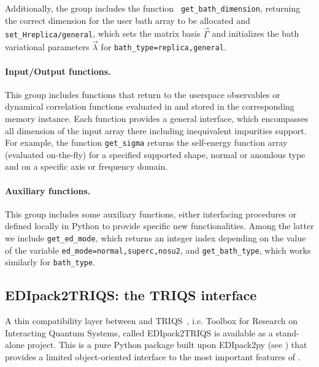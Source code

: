 \documentclass[edipack_sp.tex]{subfiles}
\begin{document}
Additionally, the group includes the function {\tt
  get\_bath\_dimension}, returning the correct
dimension for the user bath array to be allocated and {\tt
  set\_H{replica/general}}, which sets the matrix basis
$\vec{\Gamma}$ and initializes the bath variational parameters
$\vec{\lambda}$ for {\tt bath\_type=replica,general}. 




  
\paragraph{{\bf Input/Output functions}.}
This group includes functions that return to the userspace
observables or dynamical correlation functions evaluated in \NAME and
stored in the corresponding memory instance. Each function
provides a general interface, which encompasses all dimension of the
input array there including inequivalent impurities support.
For example, the function {\tt get\_sigma} returns the self-energy
function array (evaluated on-the-fly) for a specified supported shape,
normal or anomlous type and on a specific axis or frequency domain. 
    

\paragraph{{\bf Auxiliary functions}.}
This group includes some auxiliary functions, either interfacing \NAME
procedures or defined locally in Python to provide specific new
functionalities. Among the latter we include {\tt get\_ed\_mode}, which returns an integer index depending on the value of the variable {\tt ed\_mode=normal,superc,nosu2},
and {\tt get\_bath\_type}, which works similarly for {\tt bath\_type}.









\subsection{EDIpack2TRIQS: the TRIQS interface}\label{sSecInteropTRIQS}
A thin compatibility layer between \NAME and TRIQS~\cite{Parcollet2015CPC}, i.e. Toolbox for Research on
Interacting Quantum Systems,  called EDIpack2TRIQS is available as a stand-alone project. This is a pure Python package
built upon EDIpack2py (see ) that provides a
limited object-oriented interface to the most important features of \NAME.
\end{document}

